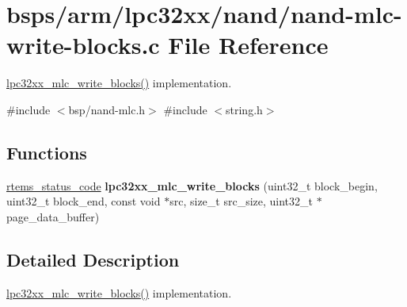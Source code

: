\hypertarget{nand-mlc-write-blocks_8c}{}\section{bsps/arm/lpc32xx/nand/nand-\/mlc-\/write-\/blocks.c File Reference}
\label{nand-mlc-write-blocks_8c}


\mbox{\hyperlink{group__lpc32xx__nand__mlc_gafa7ec91e1dfa52e3bcc614f4a9a66ab2}{lpc32xx\+\_\+mlc\+\_\+write\+\_\+blocks()}} implementation.  


{\ttfamily \#include $<$bsp/nand-\/mlc.\+h$>$}\newline
{\ttfamily \#include $<$string.\+h$>$}\newline
\subsection*{Functions}
\begin{DoxyCompactItemize}
\item 
\mbox{\label{nand-mlc-write-blocks_8c_a434068530bc8d6510782261322343d69}} 
\mbox{\hyperlink{group__ClassicStatus_ga545d41846817eaba6143d52ee4d9e9fe}{rtems\+\_\+status\+\_\+code}} {\bfseries lpc32xx\+\_\+mlc\+\_\+write\+\_\+blocks} (uint32\+\_\+t block\+\_\+begin, uint32\+\_\+t block\+\_\+end, const void $\ast$src, size\+\_\+t src\+\_\+size, uint32\+\_\+t $\ast$page\+\_\+data\+\_\+buffer)
\end{DoxyCompactItemize}


\subsection{Detailed Description}
\mbox{\hyperlink{group__lpc32xx__nand__mlc_gafa7ec91e1dfa52e3bcc614f4a9a66ab2}{lpc32xx\+\_\+mlc\+\_\+write\+\_\+blocks()}} implementation. 

